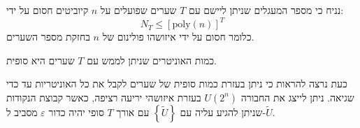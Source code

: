 \documentclass{tstextbook}
\begin{document}
\begin{proposition}
נניח כי מספר המעגלים שניתן ליישם עם \(T\) שערים שפועלים על \(n\) קיוביטים חסום על ידי:
$$N_{T}\leq\left[\mathrm{poly}\left(n\right)\right]^{T}$$
כלומר חסום על ידי איזושהו פולינום של \(n\) בחזקת מספר השערים.

\end{proposition}
\begin{corollary}
כמות האוניטרים שניתן לממש עם \(T\) שערים היא סופית.

\end{corollary}
כעת נרצה להראות כי ניתן בעזרת כמות סופית של שערים לקבל את כל האוניטריות עד כדי שגיאה.
ניתן לייצג את החבורה \(U(2^{n})\) בעזרת איזושהי יריעה רציפה, כאשר קבוצת הנקודות שניתן להגיע עליה עם \(\left\{  \widetilde{U}  \right\}\) עם אורך \(T\) סופי יהיה כדור \(\varepsilon\) מסביב ל-\(\widetilde{U}\).
\end{document}
